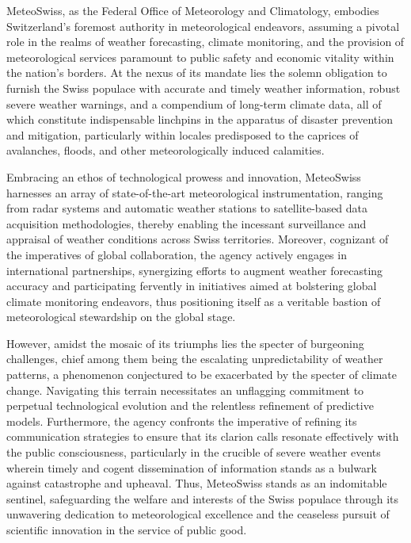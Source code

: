 MeteoSwiss, as the Federal Office of Meteorology and Climatology, embodies
Switzerland's foremost authority in meteorological endeavors, assuming a pivotal
role in the realms of weather forecasting, climate monitoring, and the provision
of meteorological services paramount to public safety and economic vitality
within the nation's borders. At the nexus of its mandate lies the solemn
obligation to furnish the Swiss populace with accurate and timely weather
information, robust severe weather warnings, and a compendium of long-term
climate data, all of which constitute indispensable linchpins in the apparatus
of disaster prevention and mitigation, particularly within locales predisposed
to the caprices of avalanches, floods, and other meteorologically induced
calamities.

Embracing an ethos of technological prowess and innovation, MeteoSwiss harnesses
an array of state-of-the-art meteorological instrumentation, ranging from radar
systems and automatic weather stations to satellite-based data acquisition
methodologies, thereby enabling the incessant surveillance and appraisal of
weather conditions across Swiss territories. Moreover, cognizant of the
imperatives of global collaboration, the agency actively engages in
international partnerships, synergizing efforts to augment weather forecasting
accuracy and participating fervently in initiatives aimed at bolstering global
climate monitoring endeavors, thus positioning itself as a veritable bastion of
meteorological stewardship on the global stage.

However, amidst the mosaic of its triumphs lies the specter of burgeoning
challenges, chief among them being the escalating unpredictability of weather
patterns, a phenomenon conjectured to be exacerbated by the specter of climate
change. Navigating this terrain necessitates an unflagging commitment to
perpetual technological evolution and the relentless refinement of predictive
models. Furthermore, the agency confronts the imperative of refining its
communication strategies to ensure that its clarion calls resonate effectively
with the public consciousness, particularly in the crucible of severe weather
events wherein timely and cogent dissemination of information stands as a
bulwark against catastrophe and upheaval. Thus, MeteoSwiss stands as an
indomitable sentinel, safeguarding the welfare and interests of the Swiss
populace through its unwavering dedication to meteorological excellence and the
ceaseless pursuit of scientific innovation in the service of public good.

